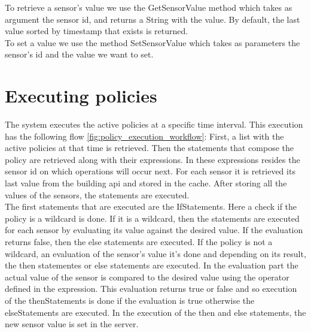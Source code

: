 To retrieve a sensor's value we use the GetSensorValue method which takes as argument the sensor id, and returns a String with the value. By default, the last value sorted by timestamp that exists is returned.  
\\ To set a value we use the method SetSensorValue which takes as parameters the sensor's id and the value we want to set. 
\section{Executing policies} 
The system executes the active policies at a specific time interval. This execution has the following flow \ref{fig:policy_execution_workflow}:
First, a list with the active policies at that time is retrieved. Then the statements that compose the policy are retrieved along with their expressions. In these expressions resides the sensor id on which operations will occur next. For each sensor it is retrieved its last value from the building api and stored in the cache. After storing all the values of the sensors, the statements are executed. 
\\The first statements that are executed are the IfStatements. Here a check if the policy is a wildcard is done.  If it is a wildcard, then the statements are executed for each sensor by evaluating its value against the desired value. If the evaluation returns false, then the else statements are executed. If the policy is not a wildcard, an evaluation of the sensor's value it's done and depending on its result, the then statementes or else statements are executed. 
In the evaluation part the actual value of the sensor is compared to the desired value using the operator defined in the expression. This evaluation returns true or false and so execution of the thenStatements is done if the evaluation is true otherwise the elseStatements are executed.
In the execution of the then and else statements, the new sensor value is set in the server. 
